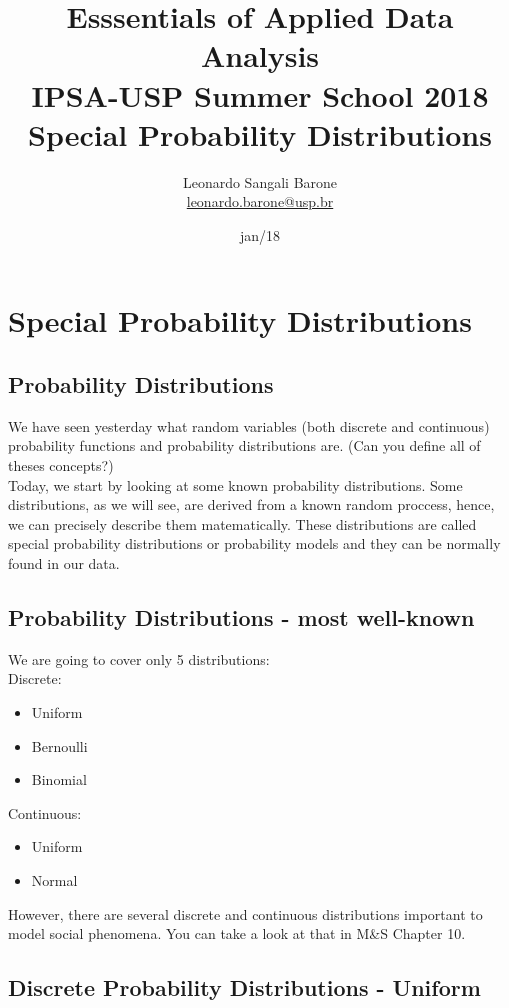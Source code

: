 \documentclass[11pt]{article}
\title{\textbf{Esssentials of Applied Data Analysis\\
				IPSA-USP Summer School 2018}\newline\\
				Special Probability Distributions}
\author{Leonardo Sangali Barone\\ \href{leonardo.barone@usp.br}{leonardo.barone@usp.br}}
\date{jan/18}
\begin{document}
\maketitle

\section*{Special Probability Distributions}

	\subsection*{Probability Distributions}
	We have seen yesterday what random variables (both discrete and continuous) probability functions and probability distributions are. (Can you define all of theses concepts?)\\
	
	Today, we start by looking at some known probability distributions. Some distributions, as we will see, are derived from a known random proccess, hence, we can precisely describe them matematically. These distributions are called special probability distributions or probability models and they can be normally found in our data.


	\subsection*{Probability Distributions - most well-known}
	We are going to cover only 5 distributions:\\

	Discrete: 
	\begin{itemize}
		\item Uniform
		\item Bernoulli
		\item Binomial
	\end{itemize}
	
	Continuous:
	\begin{itemize}
		\item Uniform
		\item Normal
	\end{itemize}

	However, there are several discrete and continuous distributions important to model social phenomena. You can take a look at that in M\&S Chapter 10.
		
	\subsection*{Discrete Probability Distributions - Uniform}
\end{document}
